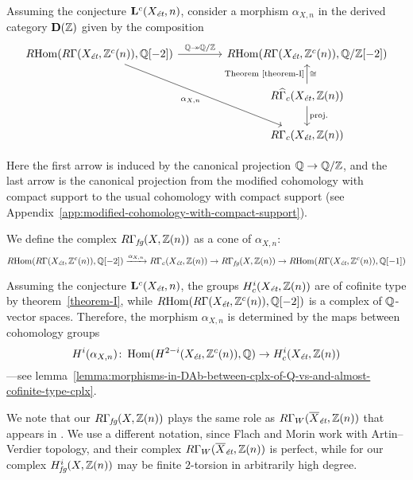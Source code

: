 \documentclass{article}
\numberwithin{equation}{section}
\begin{document}
\begin{definition}
  \label{def:RGamma-fg}
  Assuming the conjecture $\mathbf{L}^c (X_\et,n)$, consider a morphism
  $\alpha_{X,n}$ in the derived category $\mathbf{D} (\ZZ)$ given by the
  composition
  \[ \begin{tikzcd}[column sep=4em]
    \RHom (R\Gamma (X_\et, \ZZ^c (n)), \QQ[-2]) \ar{r}{\QQ \twoheadrightarrow \QQ/\ZZ}\ar{ddr}[swap]{\alpha_{X,n}} & \RHom (R\Gamma (X_\et, \ZZ^c (n)), \QQ/\ZZ[-2]) \\
    & R\widehat{\Gamma}_c (X_\et, \ZZ (n)) \ar{u}{\text{Theorem \ref{theorem-I}}}[swap]{\cong} \ar{d}{\text{proj.}} \\
    & R\Gamma_c (X_\et, \ZZ (n))
  \end{tikzcd} \]

  Here the first arrow is induced by the canonical projection $\QQ \to \QQ/\ZZ$,
  and the last arrow is the canonical projection from the modified cohomology
  with compact support to the usual cohomology with compact support
  (see Appendix~\ref{app:modified-cohomology-with-compact-support}).

  We define the complex $R\Gamma_\fg (X, \ZZ(n))$ as a cone of $\alpha_{X,n}$:
  \[ \RHom (R\Gamma (X_\et, \ZZ^c (n)), \QQ [-2]) \xrightarrow{\alpha_{X,n}}
    R\Gamma_c (X_\et, \ZZ (n)) \to
    R\Gamma_\fg (X, \ZZ(n)) \to
    \RHom (R\Gamma (X_\et, \ZZ^c (n)), \QQ [-1]) \]
\end{definition}

\begin{remark}
  \label{rmk:alpha-X-n-determined-by-cohomology}
  Assuming the conjecture $\mathbf{L}^c (X_\et, n)$, the groups
  $H^i_c (X_\et, \ZZ (n))$ are of cofinite type by theorem~\ref{theorem-I},
  while $\RHom (R\Gamma (X_\et, \ZZ^c (n)), \QQ [-2])$ is a complex of
  $\QQ$-vector spaces. Therefore, the morphism $\alpha_{X,n}$ is determined by
  the maps between cohomology groups
  \[ H^i (\alpha_{X,n})\colon
    \Hom (H^{2-i} (X_\et, \ZZ^c (n)), \QQ) \to
    H^i_c (X_\et, \ZZ (n)) \]
  ---see lemma~\ref{lemma:morphisms-in-DAb-between-cplx-of-Q-vs-and-almost-cofinite-type-cplx}.
\end{remark}

\begin{remark}
  We note that our $R\Gamma_\fg (X, \ZZ (n))$ plays the same role as
  $R\Gamma_W (\overline{X}_\et, \ZZ (n))$ that appears in
  \cite[Definition~3.6]{Flach-Morin-2018}. We use a different notation, since
  Flach and Morin work with Artin--Verdier topology, and their complex
  $R\Gamma_W (\overline{X}_\et, \ZZ (n))$ is perfect, while for our complex
  $H^i_\fg (X, \ZZ (n))$ may be finite $2$-torsion in arbitrarily high degree.
\end{remark}
\end{document}
